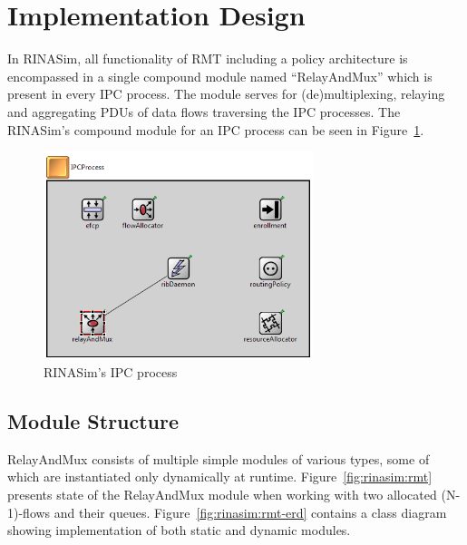     \section{Implementation Design}

        In RINASim, all functionality of RMT including a policy architecture is encompassed in a single compound module named ``RelayAndMux'' which is present in every IPC process. The module serves for (de)multiplexing, relaying and aggregating PDUs of data flows traversing the IPC processes. The RINASim's compound module for an IPC process can be seen in Figure~\ref{fig:rinasim:ipcp}.

        \begin{figure}[H]
                \begin{center}
                    \includegraphics[width=0.7\textwidth]{fig/impl_rinasim-ipcp.png}
                  \caption{RINASim's IPC process}
                  \label{fig:rinasim:ipcp}
                \end{center}
            \end{figure}

        \subsection{Module Structure}

            RelayAndMux consists of multiple simple modules of various types, some of which are instantiated only dynamically at runtime. Figure~\ref{fig:rinasim:rmt} presents state of the RelayAndMux module when working with two allocated (N-1)-flows and their queues. Figure~\ref{fig:rinasim:rmt-erd} contains a class diagram showing implementation of both static and dynamic modules.

